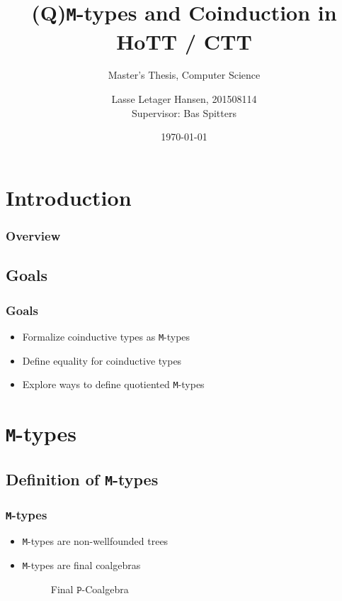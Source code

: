 \documentclass[xelatex,mathserif,serif,notheorems]{beamer} %
\title{(Q)\texttt{M}-types and Coinduction in HoTT / CTT}
\subtitle{Master's Thesis, Computer Science}
\author{\large Lasse Letager Hansen, 201508114\\[1ex]{\small Supervisor: Bas Spitters}}
\institute{Aarhus University}
\date{\today}
\theoremstyle{plain} %
\theoremstyle{definition}
\theoremstyle{remark}
\newcommand*{\type}[1]{\textcolor{magenta!90!black}{#1}}
\newcommand*{\function}[1]{\textcolor{blue!60!black}{\ensuremath{\mathtt{#1}}}}
\newcommand*{\typeformer}[1]{\ensuremath{\mathtt{#1}}}
\newcommand*{\functor}[1]{\ensuremath{\mathbf{\mathtt{#1}}}}
\begin{document}
\frame{\titlepage}

\section{Introduction}

\begin{frame}
  \frametitle{Overview}
  \tableofcontents[subsubsectionstyle=hide]
\end{frame}

\subsection{Goals}
\begin{frame}
  \frametitle{Goals}
  \begin{itemize}
  \item Formalize coinductive types as \texttt{M}-types
  \item Define equality for coinductive types %
  \item Explore ways to define quotiented \texttt{M}-types
  \end{itemize}
\end{frame}

\section{\texttt{M}-types}
\subsection{Definition of \texttt{M}-types}
\begin{frame}[fragile]
  \frametitle{\texttt{M}-types}
  \begin{itemize}
  \item \texttt{M}-types are non-wellfounded trees
  \item \texttt{M}-types are final coalgebras
    \begin{figure}[h]
      \centering
      \caption{Final \functor{P}-Coalgebra}
    \end{figure}
  \end{itemize}
\end{frame}
\end{document}
